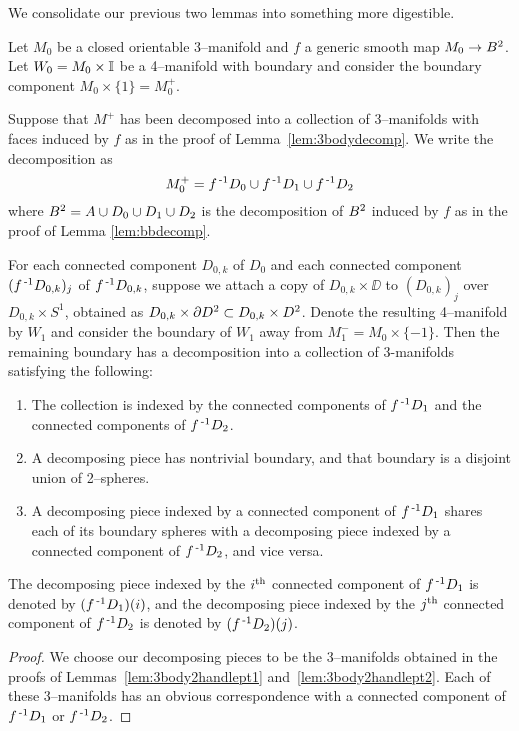 We consolidate our previous two lemmas into something more digestible.

\begin{cor}
	\label{cor:3bodyredecomp}
	Let $M_0$ be a closed orientable 3--manifold and $f$ a generic smooth map $M_0\to B^2$.
	Let $W_0=M_0\times\mathbb{I}$ be a 4--manifold with boundary and consider the boundary component $M_0\times\{1\}=M_0^+$.
	
	Suppose that $M^+$ has been decomposed into a collection of 3--manifolds with faces induced by $f$ as in the proof of Lemma~\ref{lem:3bodydecomp}.
	We write the decomposition as
	\[
		M_0^+ = f^{\,\text{-}1} D_0\cup f^{\,\text{-}1} D_1\cup f^{\,\text{-}1} D_2
	\]
	where $B^2=A\cup D_0\cup D_1\cup D_2$ is the decomposition of $B^2$ induced by $f$ as in the proof of Lemma \ref{lem:bbdecomp}.
	
	For each connected component $D_{0,k}$ of $D_0$ and each connected component $(f^{\,\text{-}1} D_{0,k})_j$ of $f^{\,\text{-}1} D_{0,k}$, suppose we attach a copy of $D_{0,k}\times\DD$ to $(D_{0,k})_j$ over $D_{0,k}\times S^1$, obtained as $D_{0,k}\times \partial D^2\subset D_{0,k}\times D^2$.
	Denote the resulting 4--manifold by $W_1$ and consider the boundary of $W_1$ away from $M_1^-=M_0\times\{-1\}$.
	Then the remaining boundary has a decomposition into a collection of 3-manifolds satisfying the following:
	\begin{enumerate}
		\item
			The collection is indexed by the connected components of $f^{\,\text{-}1} D_1$ and the connected components of $f^{\,\text{-}1} D_2$.
		
		\item
			A decomposing piece has nontrivial boundary, and that boundary is a disjoint union of 2--spheres.
		
		\item
			A decomposing piece indexed by a connected component of $f^{\,\text{-}1} D_1$ shares each of its boundary spheres with a decomposing piece indexed by a connected component of $f^{\,\text{-}1} D_2$, and vice versa.
	\end{enumerate}
	The decomposing piece indexed by the $i^{\text{th}}$ connected component of $f^{\,\text{-}1} D_1$ is denoted by $(f^{\,\text{-}1} D_1)(i)$, and the decomposing piece indexed by the $j^{\text{th}}$ connected component of $f^{\,\text{-}1} D_2$ is denoted by $(f^{\,\text{-}1} D_2)(j)$.
\end{cor}

\begin{proof}
	We choose our decomposing pieces to be the 3--manifolds obtained in the proofs of Lemmas~\ref{lem:3body2handlept1} and~\ref{lem:3body2handlept2}.
	Each of these 3--manifolds has an obvious correspondence with a connected component of $f^{\,\text{-}1} D_1$ or $f^{\,\text{-}1} D_2$.	
\end{proof}


